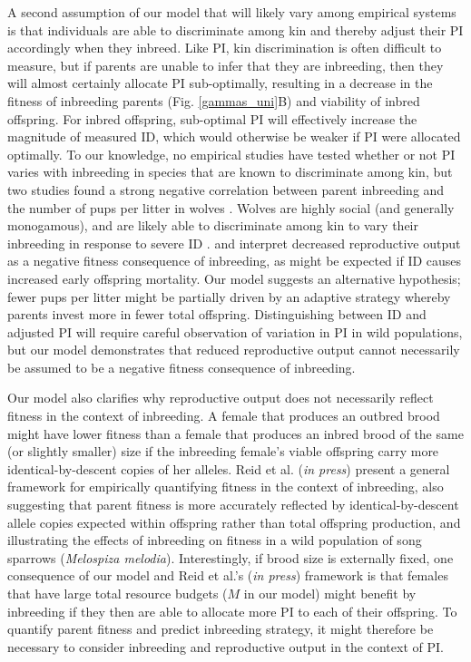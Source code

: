 \documentclass[12pt]{article}
\begin{document}
A second assumption of our model that will likely vary among empirical systems is that individuals are able to discriminate among kin and thereby adjust their PI accordingly when they inbreed. Like PI, kin discrimination is often difficult to measure, but if parents are unable to infer that they are inbreeding, then they will almost certainly allocate PI sub-optimally, resulting in a decrease in the fitness of inbreeding parents (Fig. \ref{gammas_uni}B) and viability of inbred offspring. For inbred offspring, sub-optimal PI will effectively increase the magnitude of measured ID, which would otherwise be weaker if PI were allocated optimally. To our knowledge, no empirical studies have tested whether or not PI varies with inbreeding in species that are known to discriminate among kin, but two studies found a strong negative correlation between parent inbreeding and the number of pups per litter in wolves \cite[\textit{Canis lupus}; e.g.,][]{Liberg2005, Fredrickson2007}. Wolves are highly social (and generally monogamous), and are likely able to discriminate among kin to vary their inbreeding in response to severe ID \cite[][]{Raikkonen2009, Geffen2011}. \cite{Liberg2005} and \cite{Fredrickson2007} interpret decreased reproductive output as a negative fitness consequence of inbreeding, as might be expected if ID causes increased early offspring mortality. Our model suggests an alternative hypothesis; fewer pups per litter might be partially driven by an adaptive strategy whereby parents invest more in fewer total offspring. Distinguishing between ID and adjusted PI will require careful observation of variation in PI in wild populations, but our model demonstrates that reduced reproductive output cannot necessarily be assumed to be a negative fitness consequence of inbreeding.

Our model also clarifies why reproductive output does not necessarily reflect fitness in the context of inbreeding. A female that produces an outbred brood might have lower fitness than a female that produces an inbred brood of the same (or slightly smaller) size if the inbreeding female's viable offspring carry more identical-by-descent copies of her alleles. Reid et al. (\textit{in press}) present a general framework for empirically quantifying fitness in the context of inbreeding, also suggesting that parent fitness is more accurately reflected by identical-by-descent allele copies expected within offspring rather than total offspring production, and illustrating the effects of inbreeding on fitness in a wild population of song sparrows (\textit{Melospiza melodia}). Interestingly, if brood size is externally fixed, one consequence of our model and Reid et al.'s (\textit{in press}) framework is that females that have large total resource budgets ($M$ in our model) might benefit by inbreeding if they then are able to allocate more PI to each of their offspring. To quantify parent fitness and predict inbreeding strategy, it might therefore be necessary to consider inbreeding and reproductive output in the context of PI.
\end{document}
